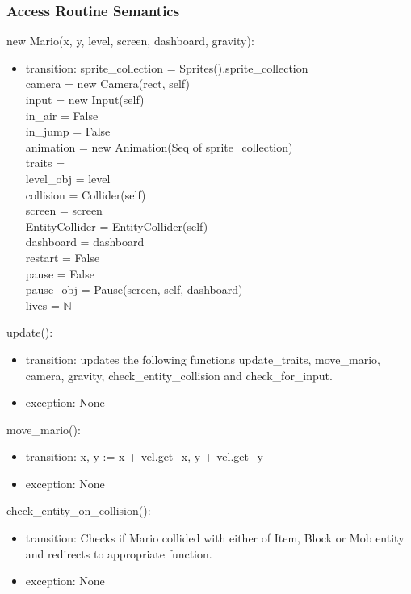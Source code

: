 \documentclass[12pt]{article}
\begin{document}
\subsubsection*{Access Routine Semantics}
new Mario(x, y, level, screen, dashboard, gravity):
\begin{itemize}
    \item transition: sprite\_collection = Sprites().sprite\_collection\\
camera = new Camera(rect, self)\\
input = new Input(self)\\
in\_air = False\\
in\_jump = False\\
animation = new Animation(Seq of sprite\_collection)\\
traits = \\
level\_obj = level\\
collision = Collider(self)\\
screen = screen\\
EntityCollider = EntityCollider(self)\\
dashboard = dashboard\\
restart = False\\
pause = False\\
pause\_obj = Pause(screen, self, dashboard)\\
lives = $\mathbb{N}$\\
\end{itemize}

update():
\begin{itemize}
    \item transition: updates the following functions update\_traits, move\_mario, camera, gravity, check\_entity\_collision and check\_for\_input.
    \item exception: None
\end{itemize}

move\_mario():
\begin{itemize}
    \item transition: x, y := x + vel.get\_x, y + vel.get\_y
    \item exception: None
\end{itemize}

check\_entity\_on\_collision():
\begin{itemize}
    \item transition: Checks if Mario collided with either of Item, Block or Mob entity and redirects to appropriate function.
    \item exception: None
\end{itemize}
\end{document}
